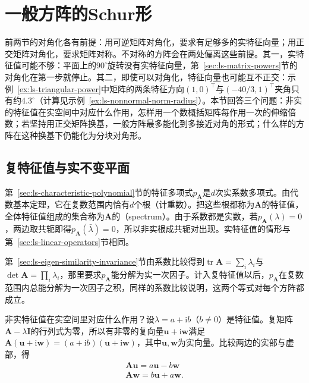 
\section{一般方阵的Schur形}
\label{sec:ls-general-square-spectrum}

前两节的对角化各有前提：用可逆矩阵对角化，要求有足够多的实特征向量；用正交矩阵对角化，要求矩阵对称。不对称的方阵会在两处偏离这些前提。其一，实特征值可能不够：平面上的$90^\circ$旋转没有实特征向量，第~\ref{sec:ls-matrix-powers}节的对角化在第一步就停止。其二，即使可以对角化，特征向量也可能互不正交：示例~\ref{ex:ls-triangular-power}中矩阵的两条特征方向$(1,0)^\top$与$(-40/3,1)^\top$夹角只有约$4.3^\circ$（计算见示例~\ref{ex:ls-nonnormal-norm-radius}）。本节回答三个问题：非实的特征值在实空间中对应什么作用，怎样用一个数概括矩阵每作用一次的伸缩倍数；若坚持用正交矩阵换基，一般方阵最多能化到多接近对角的形式；什么样的方阵在这种换基下仍能化为分块对角形。

\subsection{复特征值与实不变平面}

第~\ref{sec:ls-characteristic-polynomial}节的特征多项式$p_{\bm A}$是$d$次实系数多项式。由代数基本定理，它在复数范围内恰有$d$个根（计重数）。把这些根都称为$\bm A$的特征值，全体特征值组成的集合称为$\bm A$的（spectrum）。由于系数都是实数，若$p_{\bm A}(\lambda)=0$，两边取共轭即得$p_{\bm A}(\bar\lambda)=0$，所以非实根成共轭对出现。实特征值的情形与第~\ref{sec:ls-linear-operators}节相同。

第~\ref{sec:ls-eigen-similarity-invariance}节由系数比较得到$\operatorname{tr}\bm A=\sum_i\lambda_i$与$\det\bm A=\prod_i\lambda_i$，那里要求$p_{\bm A}$能分解为实一次因子。计入复特征值以后，$p_{\bm A}$在复数范围内总能分解为一次因子之积，同样的系数比较说明，这两个等式对每个方阵都成立。

非实特征值在实空间里对应什么作用？设$\lambda=a+\mathrm ib$（$b\neq0$）是特征值。复矩阵$\bm A-\lambda\bm I$的行列式为零，所以有非零的复向量$\bm u+\mathrm i\bm w$满足$\bm A(\bm u+\mathrm i\bm w)=(a+\mathrm ib)(\bm u+\mathrm i\bm w)$，其中$\bm u,\bm w$为实向量。比较两边的实部与虚部，得
\[
 \begin{gathered}
\bm A\bm u=a\bm u-b\bm w\\
\bm A\bm w=b\bm u+a\bm w .
 \end{gathered}
\]

